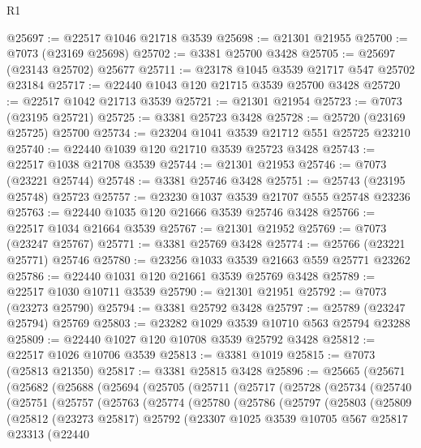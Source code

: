 \begin{lexlean}{R1}
\begin{coremodule}
@25697 := @22517 @1046 @21718 @3539
@25698 := @21301 @21955
@25700 := @7073 (@23169 @25698)
@25702 := @3381 @25700 @3428
@25705 := @25697 (@23143 @25702) @25677
@25711 := @23178 @1045 @3539 @21717 @547 @25702 @23184
@25717 := @22440 @1043 @120 @21715 @3539 @25700 @3428
@25720 := @22517 @1042 @21713 @3539
@25721 := @21301 @21954
@25723 := @7073 (@23195 @25721)
@25725 := @3381 @25723 @3428
@25728 := @25720 (@23169 @25725) @25700
@25734 := @23204 @1041 @3539 @21712 @551 @25725 @23210
@25740 := @22440 @1039 @120 @21710 @3539 @25723 @3428
@25743 := @22517 @1038 @21708 @3539
@25744 := @21301 @21953
@25746 := @7073 (@23221 @25744)
@25748 := @3381 @25746 @3428
@25751 := @25743 (@23195 @25748) @25723
@25757 := @23230 @1037 @3539 @21707 @555 @25748 @23236
@25763 := @22440 @1035 @120 @21666 @3539 @25746 @3428
@25766 := @22517 @1034 @21664 @3539
@25767 := @21301 @21952
@25769 := @7073 (@23247 @25767)
@25771 := @3381 @25769 @3428
@25774 := @25766 (@23221 @25771) @25746
@25780 := @23256 @1033 @3539 @21663 @559 @25771 @23262
@25786 := @22440 @1031 @120 @21661 @3539 @25769 @3428
@25789 := @22517 @1030 @10711 @3539
@25790 := @21301 @21951
@25792 := @7073 (@23273 @25790)
@25794 := @3381 @25792 @3428
@25797 := @25789 (@23247 @25794) @25769
@25803 := @23282 @1029 @3539 @10710 @563 @25794 @23288
@25809 := @22440 @1027 @120 @10708 @3539 @25792 @3428
@25812 := @22517 @1026 @10706 @3539
@25813 := @3381 @1019
@25815 := @7073 (@25813 @21350)
@25817 := @3381 @25815 @3428
@25896 := @25665
    (@25671
      (@25682
        (@25688
          (@25694
            (@25705
              (@25711
                (@25717
                  (@25728
                    (@25734
                      (@25740
                        (@25751
                          (@25757
                            (@25763
                              (@25774
                                (@25780
                                  (@25786
                                    (@25797
                                      (@25803
                                        (@25809
                                          (@25812
                                            (@23273 @25817)
                                            @25792
                                            (@23307
                                              @1025
                                              @3539
                                              @10705
                                              @567
                                              @25817
                                              @23313
                                              (@22440

\end{coremodule}
\end{lexlean}
